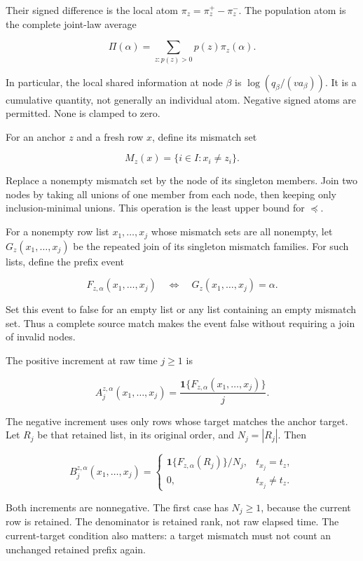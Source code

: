 Their signed difference is the local atom \(\pi_z=\pi_z^+-\pi_z^-\). The population atom is the complete joint-law average

\[
\Pi(\alpha)=\sum_{z:p(z)>0}p(z)\pi_z(\alpha).
\]

In particular, the local shared information at node \(\beta\) is \(\log(q_\beta/(v a_\beta))\). It is a cumulative quantity, not generally an individual atom. Negative signed atoms are permitted. None is clamped to zero.

\label{what-the-prefix-statistic-observes}

For an anchor \(z\) and a fresh row \(x\), define its mismatch set

\[
M_z(x)=\{i\in I:x_i\ne z_i\}.
\]

Replace a nonempty mismatch set by the node of its singleton members. Join two nodes by taking all unions of one member from each node, then keeping only inclusion-minimal unions. This operation is the least upper bound for \(\preceq\).

For a nonempty row list \(x_1,\ldots,x_j\) whose mismatch sets are all nonempty, let \(G_z(x_1,\ldots,x_j)\) be the repeated join of its singleton mismatch families. For such lists, define the prefix event

\[
F_{z,\alpha}(x_1,\ldots,x_j)
\quad\Longleftrightarrow\quad
G_z(x_1,\ldots,x_j)=\alpha.
\]

Set this event to false for an empty list or any list containing an empty mismatch set. Thus a complete source match makes the event false without requiring a join of invalid nodes.

The positive increment at raw time \(j\ge1\) is

\[
A_j^{z,\alpha}(x_1,\ldots,x_j)
=\frac{\mathbf1\{F_{z,\alpha}(x_1,\ldots,x_j)\}}{j}.
\]

The negative increment uses only rows whose target matches the anchor target. Let \(R_j\) be that retained list, in its original order, and \(N_j=|R_j|\). Then

\[
B_j^{z,\alpha}(x_1,\ldots,x_j)=
\begin{cases}
\mathbf1\{F_{z,\alpha}(R_j)\}/N_j,&t_{x_j}=t_z,\\
0,&t_{x_j}\ne t_z.
\end{cases}
\]

Both increments are nonnegative. The first case has \(N_j\ge1\), because the current row is retained. The denominator is retained rank, not raw elapsed time. The current-target condition also matters: a target mismatch must not count an unchanged retained prefix again.

